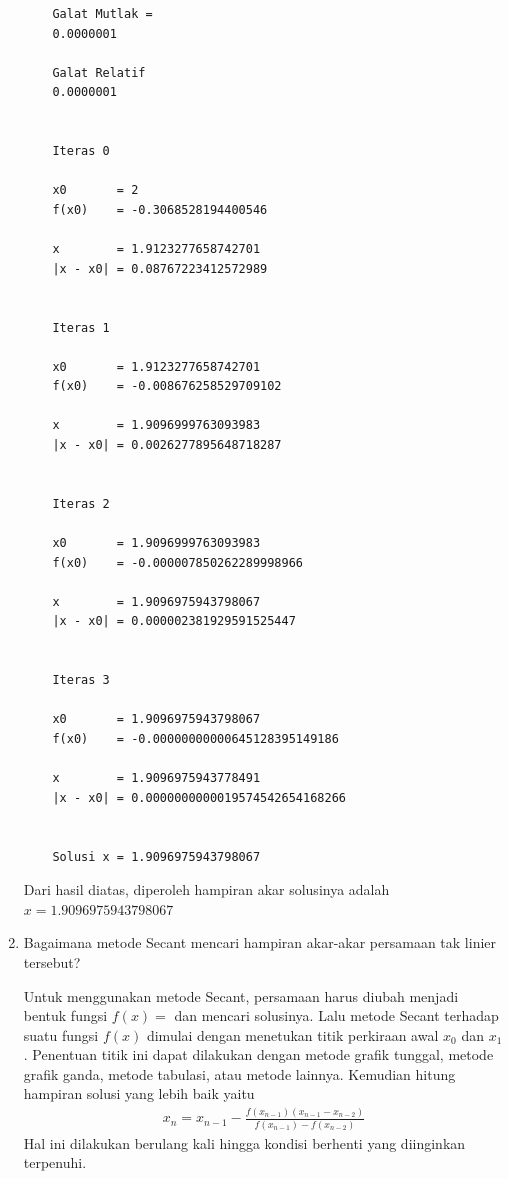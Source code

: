 \documentclass[12pt]{article}
\begin{document}
\begin{enumerate}
{\begin{lstlisting}
    Galat Mutlak =
    0.0000001
    
    Galat Relatif
    0.0000001
    
    
    Iteras 0
    
    x0       = 2
    f(x0)    = -0.3068528194400546
    
    x        = 1.9123277658742701
    |x - x0| = 0.08767223412572989
    
    
    Iteras 1
    
    x0       = 1.9123277658742701
    f(x0)    = -0.008676258529709102
    
    x        = 1.9096999763093983
    |x - x0| = 0.0026277895648718287
    
    
    Iteras 2
    
    x0       = 1.9096999763093983
    f(x0)    = -0.000007850262289998966
    
    x        = 1.9096975943798067
    |x - x0| = 0.000002381929591525447
    
    
    Iteras 3
    
    x0       = 1.9096975943798067
    f(x0)    = -0.00000000000645128395149186
    
    x        = 1.9096975943778491
    |x - x0| = 0.0000000000019574542654168266
    
    
    Solusi x = 1.9096975943798067
        \end{lstlisting}
        Dari hasil diatas, diperoleh hampiran akar solusinya adalah $ x = 1.9096975943798067 $
    } \bigskip
    \item {
        Bagaimana metode Secant mencari hampiran akar-akar persamaan tak linier tersebut?\bigskip

        Untuk menggunakan metode Secant, persamaan harus diubah menjadi bentuk fungsi $ f(x) = $ dan mencari solusinya. Lalu metode Secant terhadap suatu fungsi $ f(x) $ dimulai dengan menetukan titik perkiraan awal $ x_0 $ dan $ x_1 $. Penentuan titik ini dapat dilakukan dengan metode grafik tunggal, metode grafik ganda, metode tabulasi, atau metode lainnya. Kemudian hitung hampiran solusi yang lebih baik yaitu
        \begin{align*}
            x_n = x_{n-1} - \frac{f(x_{n-1})(x_{n-1} - x_{n-2})}{f(x_{n-1}) - f(x_{n-2})}
        \end{align*}
        Hal ini dilakukan berulang kali hingga kondisi berhenti yang diinginkan terpenuhi.\bigskip

}
\end{enumerate}
\end{document}
